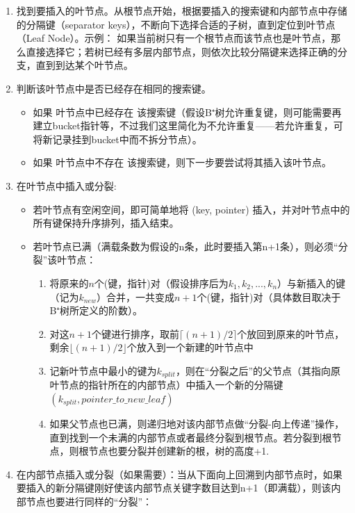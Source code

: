 \begin{enumerate}
    \item 找到要插入的叶节点。从根节点开始，根据要插入的搜索键和内部节点中存储的分隔键（separator keys），不断向下选择合适的子树，直到定位到叶节点（Leaf Node）。示例： 如果当前树只有一个根节点而该节点也是叶节点，那么直接选择它；若树已经有多层内部节点，则依次比较分隔键来选择正确的分支，直到到达某个叶节点。
    \item 判断该叶节点中是否已经存在相同的搜索键。
       \begin{itemize}
          \item 如果 叶节点中已经存在 该搜索键（假设B⁺树允许重复键，则可能需要再建立bucket指针等，不过我们这里简化为不允许重复——若允许重复，可将新记录挂到bucket中而不拆分节点）。
          \item 如果 叶节点中不存在 该搜索键，则下一步要尝试将其插入该叶节点。
       \end{itemize}
    \item 在叶节点中插入或分裂:
       \begin{itemize}
          \item 若叶节点有空闲空间，即可简单地将 (key, pointer) 插入，并对叶节点中的所有键保持升序排列，插入结束。
          \item 若叶节点已满（满载条数为假设的n条，此时要插入第n+1条），则必须“分裂”该叶节点：
              \begin{enumerate}
                  \item 将原来的$n$个(键，指针)对（假设排序后为$k_1,k_2,...,k_n$）与新插入的键（记为$k_{new}$）合并，一共变成$n+1$个(键，指针)对（具体数目取决于B⁺树所定义的阶数）。
                  \item 对这$n+1$个键进行排序，取前$\lceil (n+1)/2 \rceil$个放回到原来的叶节点，剩余$\lfloor (n+1)/2 \rfloor$个放入到一个新建的叶节点中
                  \item 记新叶节点中最小的键为$k_{split}$，则在“分裂之后”的父节点（其指向原叶节点的指针所在的内部节点）中插入一个新的分隔键$(k_{split},pointer\_to\_new\_leaf)$
                  \item 如果父节点也已满，则递归地对该内部节点做“分裂-向上传递”操作，直到找到一个未满的内部节点或者最终分裂到根节点。若分裂到根节点，则根节点也要分裂并创建新的根，树的高度+1.
              \end{enumerate}
       \end{itemize}
    \item 在内部节点插入或分裂（如果需要）：当从下面向上回溯到内部节点时，如果要插入的新分隔键刚好使该内部节点关键字数目达到n+1（即满载），则该内部节点也要进行同样的“分裂”：

\end{enumerate}
